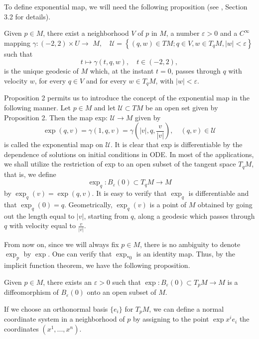 \documentclass{ctexart}
\begin{document}
To define exponential map, we will need the following proposition (see \cite{Carmo1992}, Section 3.2 for details).
\begin{proposition}
    Given $p \in M$, there exist a neighborhood $V$ of $p$ in $M$, a number $\varepsilon>0$ and a $C^{\infty}$ mapping 
    $\gamma:(-2,2) \times U \rightarrow$ $M, \quad \mathcal{U}=\left\{(q, w) \in T M ; q \in V, w \in T_q M,|w|<\varepsilon\right\}$ such that 
    $$
    t \mapsto \gamma(t, q, w), \quad t \in(-2,2), 
    $$
    is the unique geodesic of $M$ which, at the instant $t=0$, passes through $q$ with velocity $w$, for every $q \in V$ and for every $w \in T_q M$, with $|w|<\varepsilon$.
\end{proposition}

Proposition 2 permits us to introduce the concept of the exponential map in the following manner. Let $p \in M$ and let $\mathcal{U} \subset T M$ be an open set given by Proposition 2. Then the map exp: $\mathcal{U} \rightarrow M$ given by
$$
\exp (q, v)=\gamma(1, q, v)=\gamma\left(|v|, q, \frac{v}{|v|}\right), \quad(q, v) \in \mathcal{U}
$$
is called the exponential map on $\mathcal{U}$.
It is clear that exp is differentiable by the dependence of solutions on initial conditions in ODE. In most of the applications, we shall utilize the restriction of exp to an open subset of the tangent space $T_q M$, that is, we define
$$
\exp _q: B_{\varepsilon}(0) \subset T_q M \rightarrow M
$$
by $\exp _q(v)=\exp (q, v)$. It is easy to verify that $\exp _q$ is differentiable and that $\exp _q(0)=q$.
Geometrically, $\exp _q(v)$ is a point of $M$ obtained by going out the length equal to $|v|$, starting from $q$, along a geodesic which passes through $q$ with velocity equal to $\frac{v}{|v|}$. 

From now on, since we will always fix $p\in M$, there is no ambiguity to denote $\exp_p$ by $\exp$.
One can verify that $\exp_{*0}$ is an identity map. Thus, by the implicit function theorem, we have the following proposition.
\begin{proposition}
    Given $p \in M$, there exists an $\varepsilon>0$ such that $\exp : B_{\varepsilon}(0) \subset T_p M \rightarrow M$ is a diffeomorphism of $B_{\varepsilon}(0)$ onto an open subset of $M$.
\end{proposition}
If we choose an orthonormal basis $\{e_i\}$ for $T_pM$, we can define a normal coordinate system in a neighborhood of $p$ by assigning to the point $\exp x^ie_i$ the
coordinates $(x^1,...,x^n)$. 
\end{document}
